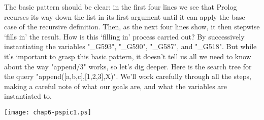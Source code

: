 The basic pattern should be clear: in the first four lines we see that
Prolog recurses its way down the list in its first argument until it
can apply the base case of the recursive definition.  Then, as the
next four lines show, it then stepwise `fills in' the result.  How is
this `filling in' process carried out?  By successively instantiating
the variables "_G593", "_G590", "_G587", and
"_G518". But while it's important to grasp this basic pattern, it
doesn't tell us all we need to know about the way "append/3" works,
so let's dig deeper. Here is the search tree for the query
"append([a,b,c],[1,2,3],X)". We'll work carefully through
all the steps, making a careful note of what our goals are,
and what the variables are instantiated to.

\begin{center}
\texttt{[image: chap6-pspic1.ps]}
\end{center}


